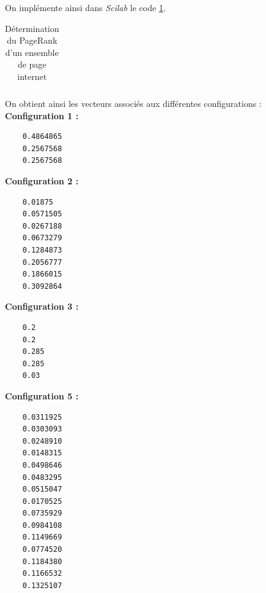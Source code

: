 \documentclass[a4paper,10pt]{report}
\begin{document}
On implémente ainsi dans \textit{Scilab} le code \ref{pagerank}.
\begin{table}[H]
\caption{Détermination du PageRank d'un ensemble de page internet}
\begin{tabular}{l}

\label{pagerank}
\end{tabular}
\end{table}
On obtient ainsi les vecteurs associés aux différentes configurations :\\
\textbf{Configuration 1 :}
\begin{verbatim}
    0.4864865  
    0.2567568  
    0.2567568
\end{verbatim}

\noindent \textbf{Configuration 2 :}
\begin{verbatim}
    0.01875    
    0.0571505  
    0.0267188  
    0.0673279  
    0.1284873  
    0.2056777  
    0.1866015  
    0.3092864
\end{verbatim}

\noindent \textbf{Configuration 3 :}
\begin{verbatim}
    0.2    
    0.2    
    0.285  
    0.285  
    0.03  
\end{verbatim}

\noindent \textbf{Configuration 5 :}
\begin{verbatim}
    0.0311925  
    0.0303093  
    0.0248910  
    0.0148315  
    0.0498646  
    0.0483295  
    0.0515047  
    0.0170525  
    0.0735929  
    0.0984108  
    0.1149669  
    0.0774520  
    0.1184380  
    0.1166532  
    0.1325107
\end{verbatim} 
\end{document}
